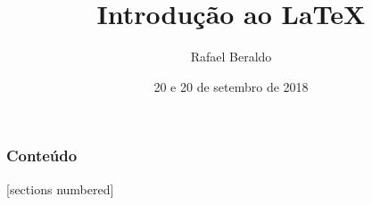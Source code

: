 \documentclass[final]{beamer}
\title{Introdução ao \LaTeX}
\author{Rafael Beraldo \qquad \email{rberaldo@cabaladada.org}}
\date{20 e 20 de setembro de 2018}
\begin{document}
\maketitle

\begin{frame}
  \frametitle{Conteúdo}
  [sections numbered]
  \begin{multicols}{2}
    \tableofcontents
  \end{multicols}
\end{frame}























\end{document}

